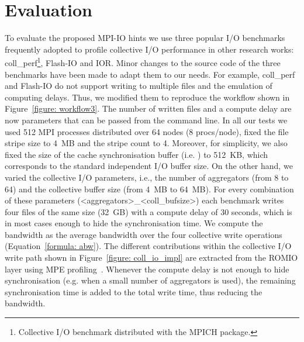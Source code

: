 \section{Evaluation}
\label{sec: results}
To evaluate the proposed MPI-IO hints we use three popular I/O benchmarks frequently adopted to profile collective I/O performance in other research works: coll\_perf\footnote{Collective I/O benchmark distributed with the MPICH package.}, Flash-IO and IOR.
Minor changes to the source code of the three benchmarks have been made to adapt them to our needs. For example, coll\_perf and Flash-IO do not support writing to multiple files and the emulation of computing delays. Thus, we modified them to reproduce the workflow shown in Figure~\ref{figure: workflow3}. The number of written files and a compute delay are now parameters that can be passed from the command line. In all our tests we used 512 MPI processes distributed over 64 nodes (8 procs/node), fixed the file stripe size to 4~MB and the stripe count to 4. Moreover, for simplicity, we also fixed the size of the cache synchronisation buffer (i.e. ) to 512~KB, which corresponds to the standard independent I/O buffer size. On the other hand, we varied the collective I/O parameters, i.e., the number of aggregators (from 8 to 64) and the collective buffer size (from 4~MB to 64~MB). For every combination of these parameters (<aggregators>\_<coll\_bufsize>) each benchmark writes four files of the same size (32~GB) with a compute delay of 30 seconds, which is in most cases enough to hide the synchronisation time. We compute the bandwidth as the average bandwidth over the four collective write operations (Equation~\ref{formula: abw}). The different  contributions within the collective I/O write path shown in Figure~\ref{figure: coll_io_impl} are extracted from the ROMIO layer using MPE profiling~\cite{mpe}.
Whenever the compute delay is not enough to hide synchronisation (e.g. when a small number of aggregators is used), the remaining synchronisation time is added to the total write time, thus reducing the bandwidth.

